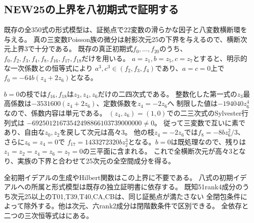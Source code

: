 \documentclass[a4paper,11pt]{ltjsarticle}
\theoremstyle{definition}
\begin{document}
\subsection{NEW25の上界を八初期式で証明する}
既存の全350式の形式模型は、証拠点で22変数の滑らかな因子と八変数横断環を与える。
真の三変数Poisson族の微分は射影次元25の下界を与えるので、横断次元上界3で十分である。
既存の真正初期式$f_0,\ldots,f_{20}$のうち、
$f_0,f_2,f_3,f_4,f_8,f_{16},f_{17},f_{18}$だけを用いる。
$a=z_1,b=z_5,c=z_7$とすると、明示的な一次係数との恒等式により
$a^3,c^3\in(f_2,f_3,f_4)$であり、$a=c=0$上で$f_0=-64b(z_4+2z_6)$となる。

$b=0$の枝では$f_{16},f_{18}$は$z_3,z_4,z_6$だけの二四次式である。
整数化した第一式の$z_3$最高係数は$-3531600(z_4+2z_6)$、定数係数を$z_4=-2z_6$へ
制限した値は$-194040z_6^4$なので、係数内容は単元である。
$(z_4,z_6)=(1,0)$での二三次式のSylvester行列式は
$-69250121673542498866103739000000\ne0$。
従って三変数で互いに素であり、自由な$z_0,z_2$を戻して次元は高々3。
他の枝$z_4=-2z_6$では$f_8=-8bz_6^2/3$、さらに$z_6=z_4=0$で
$f_{17}=1433272320bz_2^3$となる。$b=0$は既処理なので、残りは
$z_1=z_2=z_4=z_6=z_7=0$の三平面に含まれる。
これで全横断次元が高々3となり、実族の下界と合わせて25次元の全空間成分を得る。

全初期イデアルの生成やHilbert関数はこの上界に不要である。
八式の初期イデアルへの所属と形式模型は既存の独立証明書に依存する。
既知51rank4成分のうち次元25以上のT01,T39,T40,CA,CBは、同じ証拠点が満たさない
全閉包条件によって除外する。他は次元、六rank2成分は閉階数条件で区別できる。
全依存と二つの三次恒等式はにある。
\end{document}
